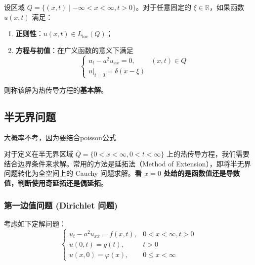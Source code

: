 \documentclass[12pt,a4paper]{ctexart}
\begin{document}
	设区域 $Q = \{(x,t) \mid -\infty < x < \infty, t > 0\}$。对于任意固定的 $\xi \in \mathbb{R}$，如果函数 $u(x,t)$ 满足：
	\begin{enumerate}
		\item \textbf{正则性}：$u(x,t) \in L_{\text{loc}}(Q)$；
		\item \textbf{方程与初值}：在广义函数的意义下满足
		\begin{equation*}
			\begin{cases}
				u_t - a^2 u_{xx} = 0, & (x,t) \in Q \\
				u \big|_{t=0} = \delta(x-\xi)
			\end{cases}
		\end{equation*}
	\end{enumerate}
	则称该解为热传导方程的\textbf{基本解}。
	
	\subsection{半无界问题}
	
	大概率不考，因为要结合poisson公式
	
	对于定义在半无界区域 $\bar{Q} = \{0 < x < \infty, 0 < t < \infty\}$ 上的热传导方程，我们需要结合边界条件来求解。常用的方法是延拓法（Method of Extension），即将半无界问题转化为全空间上的 Cauchy 问题求解。\textbf{看 $x=0$ 处给的是函数值还是导数值，判断使用奇延拓还是偶延拓}。
	
	\subsubsection{第一边值问题 (Dirichlet 问题)}
	
	考虑如下定解问题：
	\begin{equation}
		\begin{cases}
			u_t - a^2 u_{xx} = f(x,t), & 0 < x < \infty, t > 0 \\
			u(0,t) = g(t), & t > 0 \\
			u(x,0) = \varphi(x), & 0 \leqslant x < \infty
		\end{cases}
	\end{equation}
	
\end{document}
